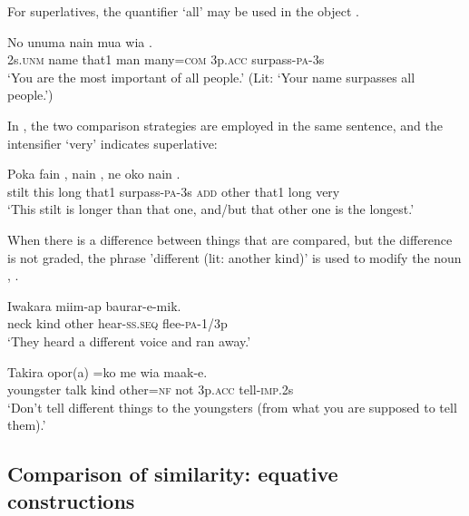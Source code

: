 For superlatives, the quantifier  `all' may be used in the object  .

\ea%
\label{ex:6:x1330}
\gll No  unuma  nain  mua    wia  . \\
2s.\textsc{unm}  name  that1  man  many=\textsc{com}  3p.\textsc{acc}  surpass-\textsc{pa}-3s\\
\glt `You are the most important of all people.' (Lit: `Your name surpasses all people.')
\z

In , the two comparison strategies are employed in the same sentence, and the intensifier  `very' indicates superlative:

\ea%
\label{ex:6:x1337}
\gll Poka  fain  ,  nain  ,  ne  oko  nain   .\\
stilt  this  long  that1  surpass-\textsc{pa}-3s  \textsc{add}  other  that1  long very\\
\glt `This stilt is longer than that one, and/but that other one is the longest.'
\z

When there is a difference between things that are compared, but the difference is not graded, the phrase  'different (lit: another kind)' is used to modify the noun , .

\ea%
\label{ex:6:x1334}
\gll Iwakara     miim-ap  baurar-e-mik. \\
neck  kind  other  hear-\textsc{ss}.\textsc{seq}  flee-\textsc{pa}-1/3p\\
\glt `They heard a different voice and ran away.'
\z

\ea%
\label{ex:6:x1335}
\gll Takira  opor(a)    =ko  me  wia  maak-e. \\
youngster  talk  kind  other=\textsc{nf}  not  3p.\textsc{acc}  tell-\textsc{imp}.2s\\
\glt `Don't tell different things to the youngsters (from what you are supposed to tell them).'
\z

\subsection{Comparison of similarity: equative constructions}

